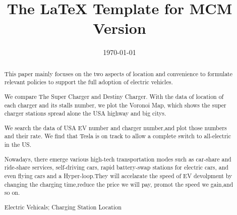 \documentclass{mcmthesis}
\title{The \LaTeX{} Template for MCM Version \MCMversion}
\date{\today}
\begin{document}
\begin{abstract}

This paper mainly focuses on the two aspects of location and convenience to formulate relevant policies to support the full adoption of electric vehicles.

We compare The Super Charger and Destiny Charger. With the data of location of each charger and its stalls number, we plot the Voronoi Map, which shows the super charger stations spread alone the USA highway and big citys.

We search the data of USA EV number and charger number,and plot those numbers and their rate. We find that Tesla is on track to allow a complete switch to all-electric in the US.

Nowadays, there emerge various high-tech transportation modes such as car-share and ride-share services, self-driving cars, rapid battery-swap stations for electric cars, and even flying cars and a Hyper-loop.They will accelarate the speed of EV devolpment by changing the charging time,reduce the price we will pay, promot the speed we gain,and so on.

%
%
%
%

\begin{keywords}
Electric Vehicals;  Charging Station Location
\end{keywords}

\end{abstract}
\maketitle
\end{document}
